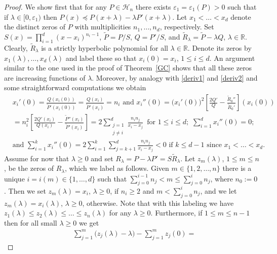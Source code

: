 \documentclass[10pt,twoside,a4paper,reqno]{amsart}
\theoremstyle{plain}
\theoremstyle{definition}
\theoremstyle{remark}
\newcommand {\bR} {\mathbb {R}}
\newcommand {\la} {\lambda}
\newcommand {\ve} {\varepsilon}
\newcommand {\calH} {\mathcal {H}}
\begin{document}
\begin{proof}
We show first that for any $P\in \calH_n$ there exists $\ve_1=\ve_1(P)>0$ 
such that if $\la\in [0,\ve_1)$ then $P(x)\preccurlyeq P(x+\la)-\la P'(x+\la)$.
Let $x_1<\ldots<x_d$ denote the distinct zeros of $P$ with multiplicities 
$n_1,\ldots,n_d$, respectively. Set 
$S(x)=\prod_{i=1}^{d}(x-x_i)^{n_i-1}$, $\tilde{P}=P/S$, $Q=P'/S$, and 
$\tilde{R}_{\la}=\tilde{P}-\la Q$, $\la\in \bR$. Clearly, $\tilde{R}_{\la}$ 
is a strictly hyperbolic polynomial for all $\la\in \bR$. Denote its 
zeros by $x_1(\la),\ldots,x_d(\la)$ and label these so that $x_i(0)=x_i$, 
$1\le i\le d$. An argument similar to the one used in the proof of 
Theorem~\ref{GC} shows that all these zeros are increasing functions of 
$\la$. Moreover, by analogy with \eqref{deriv1} and \eqref{deriv2} and 
some straightforward computations we obtain
\begin{equation}\label{approx}
\begin{split}
& x_{i}'(0)=\frac{Q(x_i(0))}{\tilde{P}'(x_i(0))}=
\frac{Q(x_i)}{\tilde{P}'(x_i)}=n_i\text{ and }
x_{i}''(0)=\big(x_{i}'(0)\big)^2\left[\frac{2Q'}{Q}-
\frac{\tilde{R}_{0}''}{\tilde{R}_{0}'}\right]\!(x_{i}(0))\\
& \!=n_{i}^{2}\left[\frac{2Q'(x_i)}{Q(x_i)}-
\frac{\tilde{P}''(x_i)}{\tilde{P}'(x_i)}\right]
=2\sum_{\substack{j=1\\ j\neq i}}^{d}\frac{n_{i}n_{j}}{x_i-x_j}
\,\text{ for }1\le i\le d;\,\,\sum_{i=1}^{d}x_{i}''(0)=0;\\
&\text{and }\sum_{i=1}^{k}x_{i}''(0)=2\sum_{i=1}^{k}\sum_{j=k+1}^{d}
\frac{n_{i}n_{j}}{x_i-x_j}<0\text{ if }k\le d-1\text{ since }
x_1<\ldots<x_d.
\end{split}
\end{equation}
Assume for now that $\la\ge 0$ and set $R_{\la}=P-\la P'=S\tilde{R}_{\la}$. 
Let $z_m(\la)$, $1\le m\le n$, be the zeros of $R_{\la}$, which we label as 
follows. Given $m\in \{1,2,\ldots,n\}$ there is a unique 
$i=i(m)\in \{1,\ldots,d\}$ 
such that $\sum_{j=0}^{i-1}n_j<m\le \sum_{j=0}^{i}n_j$, where $n_0:=0$. Then 
we set $z_m(\la)=x_i$, $\la\ge 0$, if $n_i\ge 2$ and $m<\sum_{j=0}^{i}n_j$, 
and we let $z_m(\la)=x_i(\la)$, $\la\ge 0$, otherwise. Note 
that with this labeling we have $z_1(\la)\le z_2(\la)\le \ldots\le z_n(\la)$
for any $\la\ge 0$. Furthermore, if $1\le m\le n-1$ then for all small 
$\la\ge 0$ we get
\begin{equation}\label{approx1}
\begin{split}
& \sum_{j=1}^{m}\big(z_j(\la)-\la\big)-\sum_{j=1}^{m}z_j(0)=

\end{split}
\end{equation}
\end{proof}
\end{document}
